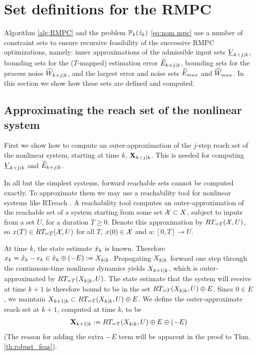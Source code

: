 \section{Set definitions for the RMPC}
\label{sec:set definitions}

Algorithm \ref{alg:RMPC} and the problem $\mathbb{P}_{k}(\hat{z}_{k})$ \eqref{eq:nom mpc} use a number of constraint sets to ensure recursive feasibility of the successive RMPC optimizations, namely: 
inner approximations of the admissible input sets $\underline{V}_{k+j|k}$, 
bounding sets for the ($T$-mapped) estimation error $\widetilde{E}_{k+j|k}$, 
bounding sets for the process noise $\widehat{W}_{k+j|k}$, 
and the largest error and noise sets $\widetilde{E}_{max}$ and $\widehat{W}_{max}$.
In this section we show how these sets are defined and computed.

 \subsection{Approximating the reach set of the nonlinear system}
 \label{sec:x reach}

 First we show how to compute an outer-approximation of the $j$-step reach set of the nonlinear system, starting at time $k$, $ \mathbf{X}_{k+j|k}$.
This is needed for computing $\underline{V}_{k+j|k}$ and $\widetilde{E}_{k+j|k}$.
 
 In all but the simplest systems, forward reachable sets cannot be computed exactly.
 To approximate them we may use a reachability tool for nonlinear systems like RTreach \cite{JohnsonBCS16_Rtreach}.
 A reachability tool computes an outer-approximation of the reachable set of a system starting from some set $\mathcal{X} \subset X$, subject to inputs from a set $U$, for a duration $T \geq 0$. 
 Denote this approximation by $RT_{=T}(\mathcal{X},U)$, so $x(T) \in RT_{=T}(\mathcal{X},U)$ for all $T$, $x(0) \in \mathcal{X}$ and $u:[0,T] \rightarrow U$.
 
 At time $k$, the state estimate $\hat{x}_{k}$ is known.
 Therefore $x_k = \hat{x}_{k} - e_k \in \hat{x}_{k} \oplus (-E) := X_{k|k}$.
 Propagating $X_{k|k}$ forward one step through the continuous-time nonlinear dynamics yields $X_{k+1|k}$, which is outer-approximated by $RT_{=T}(X_{k|k},U)$.
 The state estimate that the system will receive at time $k+1$ is therefore bound to be in the set $RT_{=T}(X_{k|k},U)  \oplus E$.
 Since $0 \in E$, we maintain $X_{k+1|k} \subset RT_{=T}(X_{k|k},U)  \oplus E$.
 We define the outer-approximate reach set at $k+1$, computed at time $k$, to be 
 \begin{equation*}
 \label{eq:def Xk}
 \mathbf{X}_{k+1|k} :=  RT_{=T}(X_{k|k},U)  \oplus E \oplus  (-E)
 \end{equation*}
 (The reason for adding the extra $-E$ term will be apparent in the proof to Thm. \ref{th:robust_feas}).

